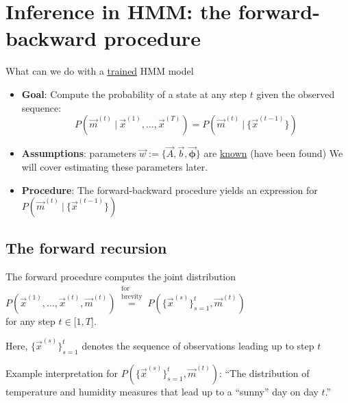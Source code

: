 \section{Inference in HMM: the forward-backward procedure}

\begin{frame} 
    \begin{center}
    What can we do with a \underline{trained} HMM model
    \end{center}
	
\end{frame}

\begin{frame}

\begin{itemize}
\item[] \textbf{Goal}: Compute the probability of a state at any step $t$ given the observed sequence:
\begin{equation}
P(\vec{m}^{(t)}  ~|~ \vec{x}^{(1)},  \ldots,\vec{x}^{(T)}) =
		P(\vec{m}^{(t)}  ~|~ \{\vec{x}^{(t-1)}\})
\end{equation}

\item[] \textbf{Assumptions}: parameters $\vec{w} := \{
		\vec{A},
		\vec{b},
		\vec{\boldsymbol{\phi}}
		\}$ are \underline{known} (have been found) We will cover estimating these parameters later.
\item[] \textbf{Procedure}: The forward-backward procedure yields an expression for $P(\vec{m}^{(t)}  ~|~ \{\vec{x}^{(t-1)}\})$

\end{itemize}

\end{frame}

\subsection{The forward recursion}

\begin{frame}{\subsecname}

The forward procedure computes the joint distribution $P(\vec x^{(1)}, \ldots , \vec x^{(t)}, \vec m^{(t)}) \stackrel{\substack{\text{for}\\ \text{brevity}}}{=} P(\{\vec x^{(s)}\}_{s=1}^t, \vec m^{(t)})$\\
for any step $t \in \lbrack 1, T\rbrack$.\\

\svspace{5mm}

Here, $\{\vec x^{(s)}\}_{s=1}^t$ denotes the sequence of observations leading up to step $t$\\

\svspace{5mm}

Example interpretation for $P(\{\vec x^{(s)}\}_{s=1}^t, \vec m^{(t)})$: ``The distribution of temperature and humidity measures that lead up to a ``sunny'' day on day $t$.''

\end{frame}

